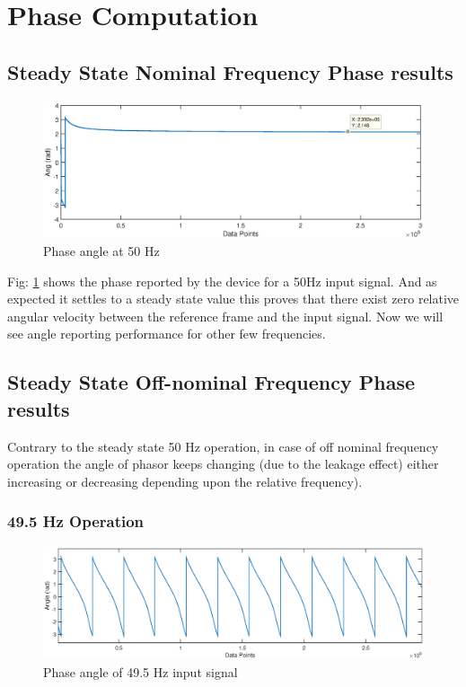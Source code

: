 
\section{Phase Computation}
\subsection{Steady State Nominal Frequency Phase results}
 
\begin{figure}[h]
	\includegraphics[width=\textwidth]{fig/50Hz_angle.eps}
	\caption{Phase angle at 50 Hz}
	\label{fig:50Hz ang}
\end{figure}
Fig: \ref{fig:50Hz ang} shows the phase reported by the device for a 50Hz input signal. And as expected it settles to a steady state value this proves that there exist zero relative angular velocity between the reference frame and the input signal. Now we will see angle reporting performance for other few frequencies.

\subsection{Steady State Off-nominal Frequency Phase results}
Contrary to the steady state 50 Hz operation, in case of off nominal frequency operation the angle of phasor keeps changing (due to the leakage effect) either increasing or decreasing depending upon the relative frequency). 
\subsubsection{49.5 Hz Operation}
\begin{figure}[h]
	\includegraphics[width=\textwidth]{fig/495Hz_ang.eps}
	\caption{Phase angle of 49.5 Hz input signal}
	\label{fig:49.5Hz ang}
\end{figure}

